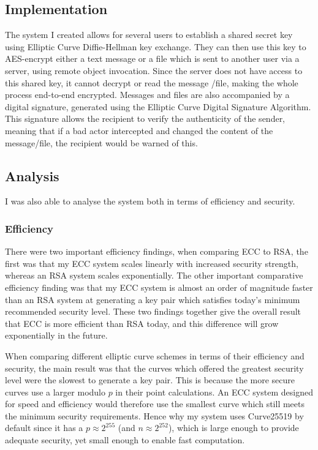\documentclass[12pt,a4paper]{article}
\begin{document}
\subsection{Implementation} \noindent
The system I created allows for several users to establish a shared secret key using Elliptic Curve Diffie-Hellman key exchange. 
They can then use this key to AES-encrypt either a text message or a file which is sent to another user via a server, using remote object invocation. 
Since the server does not have access to this shared key, it cannot decrypt or read the message /file, making the whole process end-to-end encrypted. 
Messages and files are also accompanied by a digital signature, generated using the Elliptic Curve Digital Signature Algorithm. 
This signature allows the recipient to verify the authenticity of the sender, meaning that if a bad actor intercepted and changed the content of the message/file, the recipient would be warned of this. 

\subsection{Analysis} \noindent
I was also able to analyse the system both in terms of efficiency and security. 

\subsubsection{Efficiency} \noindent
There were two important efficiency findings, when comparing ECC to RSA, 
the first was that my ECC system scales linearly with increased security strength, 
whereas an RSA system scales exponentially. 
The other important comparative efficiency finding was that my ECC system is almost an order of magnitude faster than an RSA system at generating a key pair which satisfies today's minimum recommended security level. 
These two findings together give the overall result that ECC is more efficient than RSA today, 
and this difference will grow exponentially in the future. 

When comparing different elliptic curve schemes in terms of their efficiency and security, 
the main result was that the curves which offered the greatest security level were the slowest to generate a key pair. 
This is because the more secure curves use a larger modulo $p$ in their point calculations. 
An ECC system designed for speed and efficiency would therefore use the smallest curve which still meets the minimum security requirements. 
Hence why my system uses Curve25519 by default since it has a $p \approx 2^{255}$ (and $n \approx 2^{252}$), 
which is large enough to provide adequate security, yet small enough to enable fast computation. 
\end{document}
